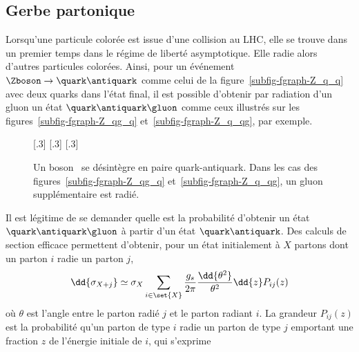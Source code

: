\subsection{Gerbe partonique}\label{chapter-JERC-section-jets-subsec-gerbe-partonique}
Lorsqu'une particule colorée est issue d'une collision au LHC, elle se trouve dans un premier temps dans le régime de liberté asymptotique. Elle radie alors d'autres particules colorées. Ainsi, pour un événement $\Zboson\to\quark\antiquark$ comme celui de la figure~\ref{subfig-fgraph-Z_q_q} avec deux quarks dans l'état final, il est possible d'obtenir par radiation d'un gluon un état $\quark\antiquark\gluon$ comme ceux illustrés sur les figures~\ref{subfig-fgraph-Z_qg_q} et~\ref{subfig-fgraph-Z_q_qg}, par exemple.
\begin{figure}[h]
\centering\vspace{\baselineskip}
\subcaptionbox{\label{subfig-fgraph-Z_q_q}}[.3\textwidth]
{\vspace{\baselineskip}}
\hfill
\subcaptionbox{\label{subfig-fgraph-Z_qg_q}}[.3\textwidth]
{\vspace{\baselineskip}}
\hfill
\subcaptionbox{\label{subfig-fgraph-Z_q_qg}}[.3\textwidth]
{\vspace{\baselineskip}}
\caption{Un boson \Zboson\ se désintègre en paire quark-antiquark. Dans les cas des figures~\ref{subfig-fgraph-Z_qg_q} et~\ref{subfig-fgraph-Z_q_qg}, un gluon supplémentaire est radié.}
\label{fig-fgraph-Z_q_q_xg}
\end{figure}
\par Il est légitime de se demander quelle est la probabilité d'obtenir un état $\quark\antiquark\gluon$ à partir d'un état $\quark\antiquark$.
Des calculs de section efficace permettent d'obtenir, pour un état initialement à $X$ partons dont un parton $i$ radie un parton $j$,
\begin{equation}
\dd{\sigma_{X+j}} \simeq \sigma_{X} \sum_{i\in\set{X}} \frac{g_s}{2\pi} \frac{\dd{\theta^2}}{\theta^2} \dd{z} P_{ij}(z)
\end{equation}
où $\theta$ est l'angle entre le parton radié $j$ et le parton radiant $i$. La grandeur $P_{ij}(z)$ est la probabilité qu'un parton de type $i$ radie un parton de type $j$ emportant une fraction $z$ de l'énergie initiale de $i$, qui s'exprime
